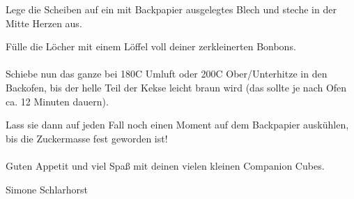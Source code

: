 {Lege die Scheiben auf ein mit Backpapier ausgelegtes Blech
und steche in der Mitte Herzen aus. 

Fülle die Löcher mit einem Löffel voll
deiner zerkleinerten Bonbons.
\\~\\
Schiebe nun das ganze bei 180\textdegree{}C Umluft oder 200\textdegree{}C Ober/Unterhitze in den
Backofen, bis der helle Teil der Kekse leicht braun wird (das sollte je nach
Ofen ca. 12 Minuten dauern). 

Lass sie dann auf jeden Fall noch einen Moment auf
dem Backpapier auskühlen, bis die Zuckermasse fest geworden ist!
\\~\\
Guten Appetit und viel Spaß mit deinen vielen kleinen Companion Cubes.
}
{Simone Schlarhorst}
